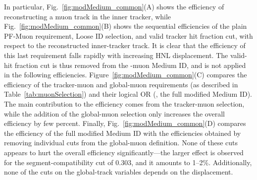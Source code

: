 In particular, Fig.~\ref{fig:modMedium_common}(A) shows the efficiency of
reconstructing a muon track in the inner tracker, while 
Fig.~\ref{fig:modMedium_common}(B) shows the sequential
efficiencies of the plain PF-Muon requirement, Loose ID selection, and
valid tracker hit fraction cut, with respect to the reconstructed
inner-tracker track. It is clear that the efficiency of
this last requirement falls rapidly with increasing HNL
displacement. The valid-hit fraction cut is thus removed from the
\displ-muon Medium ID, and is not applied in the following
efficiencies.
Figure~\ref{fig:modMedium_common}(C) compares the efficiency of the
tracker-muon and global-muon requirements (as described in
Table~\ref{tab:muonSelection}) and their logical OR (\ie, the full
modified Medium ID). The main contribution to the efficiency comes
from the tracker-muon selection, while the addition of the global-muon
selection only increases the overall efficiency by few percent.
Finally, Fig.~\ref{fig:modMedium_common}(D) compares the efficiency of
the full modified Medium ID with the efficiencies obtained by removing
individual cuts from the global-muon definition. None of these cuts
appears to hurt the overall efficiency significantly---the larger
effect is observed for the segment-compatibility cut of 0.303, and it
amounts to 1--2\%. Additionally, none of the cuts on the global-track
variables depends on the displacement.
